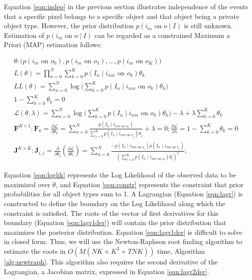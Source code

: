 \documentclass[11pt]{article}
\begin{document}
Equation \ref{eqn:indep} in the previous section illustrates independence of the events that a specific pixel belongs to a specific object and that object being a private object type.  However, the prior distribution $p(i_m \textrm{ on } o \mid I)$ is still unknown.  Estimation of $p(i_m \textrm{ on } o \mid I)$ can be regarded as a constrained Maximum a Priori (MAP) estimation follows:

\begin{gather}
	\theta : \Big(p(i_m \textrm{ on } o_0), p(i_m \textrm{ on } o_1),
		\dots, p(i_m \textrm{ on } o_K)\Big) \\
	L(\theta) = \prod_{n=0}^{N} \sum_{k=0}^{K} p(I_n \mid i_{nm} 
		\textrm{ on } o_k) \theta_k \\
	LL(\theta) = \sum_{n=0}^{N} \log \Big( \sum_{k=0}^{K} 
		p(I_n \mid i_{nm} \textrm{ on } o_k) \theta_k \Big) \label{eqn:loglik}\\
	1 - \sum_{k=0}^{K} \theta_k = 0 \label{eqn:constr}\\
	\mathcal{L}(\theta, \lambda) = \sum_{n=0}^{N} \log 
		\Big( \sum_{k=0}^{K} p(I_n \mid i_{nm} \textrm{ on } o_k) \theta_k \Big) - \lambda + \lambda \sum_{k=0}^{K} \theta_k \label{eqn:lagr}\\
	\mathbf{F}^{K \times 1}: \mathbf{F}_k = \frac{\partial \mathcal{L}}{\partial \theta_k} = 
		\sum_{n=0}^{N} \frac
			{p(I_n \mid i_{nm \textrm{ on } o_k})}
			{\sum_{j=0}^{K} p(I_n \mid i_{nm \textrm{ on } o_j}) \theta_j} 
			    + \lambda = 0;
		\frac{\partial \mathcal{L}}{\partial \lambda} = 1 - \sum_{k=0}^{K} 
			\theta_k = 0 \label{eqn:lagr1der}\\
	\mathbf{J}^{K \times K}: \mathbf{J}_{i,j} = \frac{\partial}{\partial \theta_j}     \left( \frac
		    {\partial \mathcal{L}}{\partial \theta_i} \right) = 
		\sum_{n=0}^{N} \frac
			{-p(I_n \mid i_{nm \textrm{ on } o_i})p(I_n \mid i_{nm 
			    \textrm{ on } o_j})}
			{(\sum_{l=0}^{K} p(I_n \mid i_{nm \textrm{ on } o_l}) \theta_l)^2} \label{eqn:lagr2der};
\end{gather}

Equation \ref{eqn:loglik} represents the Log Likelihood of the observed data to be maximized over $\theta$, and Equation \ref{eqn:constr} represents the constraint that prior probabilities for all object types sum to 1.  A Lagrangian (Equation \ref{eqn:lagr}) is constructed to define the boundary on the Log Likelihood along which the constraint is satisfied.  The roots of the vector of first derivatives for this boundary (Equation \ref{eqn:lagr1der}) will contain the prior distribution that maximizes the posterior distribution.  Equation \ref{eqn:lagr1der} is difficult to solve in closed form. Thus, we will use the Newton-Raphson root finding algorithm to estimate the roots in $O(M(NK + K^3 + TNK))$ time, Algorithm \ref{alg:newtraph}.  This algorithm also requires the second derivative of the Lagrangian, a Jacobian matrix, expressed in Equation \ref{eqn:lagr2der}.
\end{document}
